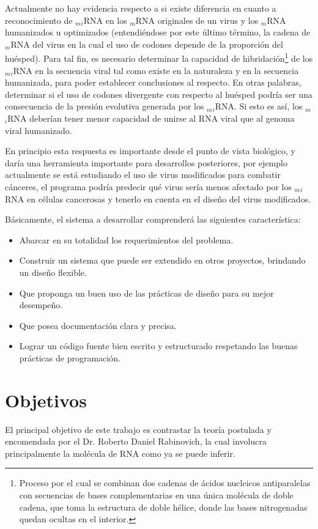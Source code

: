 \par Actualmente no hay evidencia respecto a si existe diferencia en cuanto a reconocimiento de $_m$$_i$RNA en los $_m$RNA originales de un virus y los $_m$RNA humanizados u optimizados (entendiéndose por este último término, la cadena de $_m$RNA del virus en la cual el uso de codones depende de la proporción del huésped). Para tal fin, es necesario determinar la capacidad de hibridación\footnote{Proceso por el cual se combinan dos cadenas de ácidos nucleicos antiparalelas con secuencias de bases complementarias en una única molécula de doble cadena, que toma la estructura de doble hélice, donde las bases nitrogenadas quedan ocultas en el interior.} de los $_m$$_i$RNA en la secuencia viral tal como existe en la naturaleza y en la secuencia humanizada, para poder establecer conclusiones al respecto. En otras palabras, determinar si el uso de codones divergente con respecto al huésped podría ser una consecuencia de la presión evolutiva generada por los $_m$$_i$RNA. Si esto es así, los $_m$$_i$RNA deberían tener menor capacidad de unirse al RNA viral que al genoma viral humanizado. 

\par En principio esta respuesta es importante desde el punto de vista biológico, y daría una herramienta importante para desarrollos posteriores, por ejemplo actualmente se está estudiando el uso de virus modificados para combatir cánceres, el programa podría predecir qué virus sería menos afectado por los $_m$$_i$RNA en células cancerosas y tenerlo en cuenta en el diseño del virus modificados.

\par Básicamente, el sistema a desarrollar comprenderá las siguientes característica:
\begin{itemize}
	\item Abarcar en su totalidad los requerimientos del problema.
	\item Construir un sistema que puede ser extendido en otros proyectos, brindando un diseño flexible. 
	\item Que proponga un buen uso de las prácticas de diseño para su mejor desempeño.
	\item Que posea documentación clara y precisa.
	\item Lograr un código fuente bien escrito y estructurado respetando las buenas prácticas de programación.
\end{itemize}

\section{Objetivos}
\par El principal objetivo de este trabajo es contrastar la teoría postulada y encomendada por el Dr. Roberto Daniel Rabinovich, la cual involucra principalmente la molécula de RNA como ya se puede inferir. 

